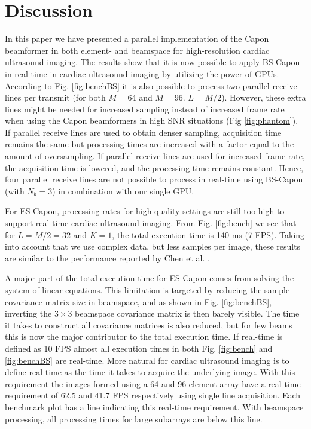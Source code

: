\documentclass[journal]{IEEEtran}
\begin{document}
\section{Discussion}\label{sec:dis}
In this paper we have presented a parallel implementation of the Capon beamformer in both element- and beamspace for high-resolution cardiac ultrasound imaging. The results show that it is now possible to apply BS-Capon in real-time in cardiac ultrasound imaging by utilizing the power of GPUs. According to Fig. \ref{fig:benchBS} it is also possible to process two parallel receive lines per transmit (for both $M=64$ and $M=96$. $L=M/2$). However, these extra lines might be needed for increased sampling instead of increased frame rate when using the Capon beamformers in high SNR situations (Fig \ref{fig:phantom}). If parallel receive lines are used to obtain denser sampling, acquisition time remains the same but processing times are increased with a factor equal to the amount of oversampling. If parallel receive lines are used for increased frame rate, the acquisition time is lowered, and the processing time remains constant. Hence, four parallel receive lines are not possible to process in real-time using BS-Capon (with $N_b=3$) in combination with our single GPU.

For ES-Capon, processing rates for high quality settings are still too high to support real-time cardiac ultrasound imaging. From Fig. \ref{fig:bench} we see that for $L = M/2 = 32$ and $K=1$, the total execution time is 140 ms (7 FPS). Taking into account that we use complex data, but less samples per image, these results are similar to the performance reported by Chen et al. \cite{Chen2011}.

A major part of the total execution time for ES-Capon comes from solving the system of linear equations. This limitation is targeted by reducing the sample covariance matrix size in beamspace, and as shown in Fig. \ref{fig:benchBS}, inverting the $3\times3$ beamspace covariance matrix is then barely visible. The time it takes to construct all covariance matrices is also reduced, but for few beams this is now the major contributor to the total execution time. If real-time is defined as 10 FPS \cite{Chen2011} almost all execution times in both Fig. \ref{fig:bench} and \ref{fig:benchBS} are real-time. More natural for cardiac ultrasound imaging is to define real-time as the time it takes to acquire the underlying image. With this requirement the images formed using a 64 and 96 element array have a real-time requirement of 62.5 and 41.7 FPS respectively using single line acquisition. Each benchmark plot has a line indicating this real-time requirement. With beamspace processing, all processing times for large subarrays are below this line.
\end{document}
